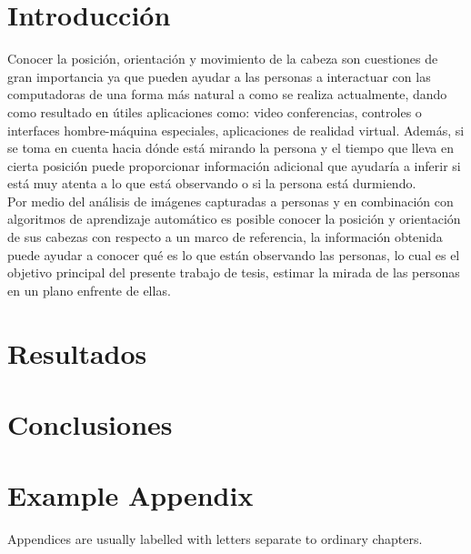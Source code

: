 \documentclass[12pt,oneside]{book}
\begin{document}
   \chapter{Introducción}
   Conocer la posición, orientación y movimiento de la cabeza son cuestiones de gran importancia ya que pueden ayudar a las personas a interactuar con las computadoras de una forma más natural a como se realiza actualmente, dando como resultado en útiles  aplicaciones como: video conferencias, controles o interfaces hombre-máquina especiales, aplicaciones de realidad virtual. Además, si se toma en cuenta hacia dónde está mirando la persona y el tiempo que lleva en cierta posición puede proporcionar información adicional que ayudaría a inferir si está muy atenta a lo que está observando o si la persona está durmiendo.\\
   Por medio del análisis de imágenes capturadas a personas y en combinación con algoritmos de aprendizaje automático es posible conocer la posición y  orientación de sus cabezas con respecto a un marco de referencia, la información obtenida puede ayudar a conocer qué es lo que están observando las personas, lo cual es el objetivo principal del presente trabajo de tesis, estimar la mirada de las personas en un plano enfrente de ellas.
   












 


\chapter{Resultados}

\chapter{Conclusiones}



\appendix
\chapter{Example Appendix}
Appendices are usually labelled with letters separate to ordinary chapters.








%
%
%
%

\end{document}
